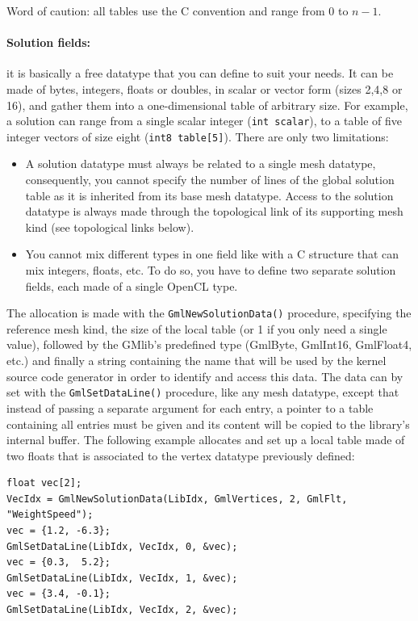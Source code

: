 \documentclass[a4paper,12pt]{article}
\begin{document}
Word of caution: all tables use the C convention and range from $0$ to $n-1$.

\paragraph{Solution fields:} it is basically a free datatype that you can define to suit your needs. It can be made of bytes, integers, floats or doubles, in scalar or vector form (sizes 2,4,8 or 16), and gather them into a one-dimensional table of arbitrary size. For example, a solution can range from a single scalar integer ({\tt int scalar}), to a table of five integer vectors of size eight ({\tt int8 table[5]}). There are only two limitations:
\medskip

\begin{itemize}
        \item A solution datatype must always be related to a single mesh datatype, consequently, you cannot specify the number of lines of the global solution table as it is inherited from its base mesh datatype. Access to the solution datatype is always made through the topological link of its supporting mesh kind (see topological links below).
        \item You cannot mix different types in one field like with a C structure that can mix integers, floats, etc. To do so, you have to define two separate solution fields, each made of a single OpenCL type.
\end{itemize}
\medskip

The allocation is made with the {\tt GmlNewSolutionData()} procedure, specifying the reference mesh kind, the size of the local table (or 1 if you only need a single value), followed by the GMlib's predefined type (GmlByte, GmlInt16, GmlFloat4, etc.) and finally a string containing the name that will be used by the kernel source code generator in order to identify and access this data. The data can by set with the {\tt GmlSetDataLine()} procedure, like any mesh datatype, except that instead of passing a separate argument for each entry, a pointer to a table containing all entries must be given and its content will be copied to the library's internal buffer. The following example allocates and set up a local table made of two floats that is associated to the vertex datatype previously defined:

\begin{tt}
\begin{verbatim}
float vec[2];
VecIdx = GmlNewSolutionData(LibIdx, GmlVertices, 2, GmlFlt, "WeightSpeed");
vec = {1.2, -6.3};
GmlSetDataLine(LibIdx, VecIdx, 0, &vec);
vec = {0.3,  5.2};
GmlSetDataLine(LibIdx, VecIdx, 1, &vec);
vec = {3.4, -0.1};
GmlSetDataLine(LibIdx, VecIdx, 2, &vec);
\end{verbatim}
\end{tt}
\normalfont
\end{document}
